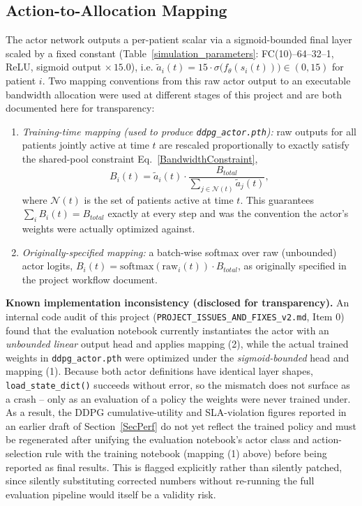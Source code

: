 \documentclass[10pt,journal,compsoc]{IEEEtran}
\begin{document}
\subsection{Action-to-Allocation Mapping}
\label{ActionMapping}
 
The actor network outputs a per-patient scalar via a sigmoid-bounded final
layer scaled by a fixed constant (Table~\ref{simulation_parameters}:
FC(10)--64--32--1, ReLU, sigmoid output $\times\,15.0$), i.e.
$\tilde a_i(t) = 15\cdot\sigma\!\big(f_\theta(s_i(t))\big) \in (0,15)$ for
patient $i$. Two mapping conventions from this raw actor output to an
executable bandwidth allocation were used at different stages of this
project and are both documented here for transparency:
 
\begin{enumerate}
\item \textit{Training-time mapping (used to produce \texttt{ddpg\_actor.pth}):}
raw outputs for all patients jointly active at time $t$ are rescaled
proportionally to exactly satisfy the shared-pool constraint
Eq.~\eqref{BandwidthConstraint},
\begin{equation}
B_i(t) = \tilde a_i(t)\cdot\frac{B_{total}}{\sum_{j\in\mathcal{N}(t)}\tilde a_j(t)},
\end{equation}
where $\mathcal{N}(t)$ is the set of patients active at time $t$. This
guarantees $\sum_i B_i(t) = B_{total}$ exactly at every step and was the
convention the actor's weights were actually optimized against.
\item \textit{Originally-specified mapping:} a batch-wise softmax over raw
(unbounded) actor logits, $B_i(t) = \mathrm{softmax}(\text{raw}_i(t))\cdot
B_{total}$, as originally specified in the project workflow document.
\end{enumerate}
 
\noindent\textbf{Known implementation inconsistency (disclosed for
transparency).} An internal code audit of this project
(\texttt{PROJECT\_ISSUES\_AND\_FIXES\_v2.md}, Item 0) found that the
evaluation notebook currently instantiates the actor with an
\emph{unbounded linear} output head and applies mapping (2), while the
actual trained weights in \texttt{ddpg\_actor.pth} were optimized under the
\emph{sigmoid-bounded} head and mapping (1). Because both actor
definitions have identical layer shapes, \texttt{load\_state\_dict()}
succeeds without error, so the mismatch does not surface as a crash --
only as an evaluation of a policy the weights were never trained under. As
a result, the DDPG cumulative-utility and SLA-violation figures reported in
an earlier draft of Section~\ref{SecPerf} do not yet reflect the trained
policy and must be regenerated after unifying the evaluation notebook's
actor class and action-selection rule with the training notebook
(mapping (1) above) before being reported as final results. This is flagged
explicitly rather than silently patched, since silently substituting
corrected numbers without re-running the full evaluation pipeline would
itself be a validity risk.
 
\end{document}
